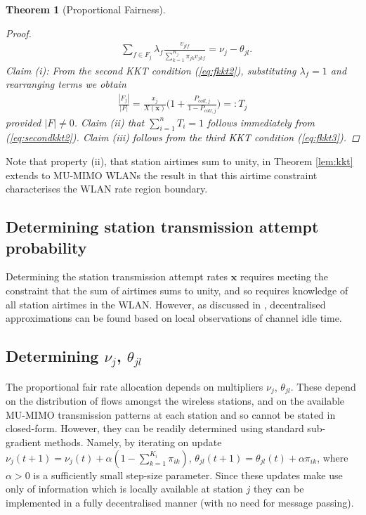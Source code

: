 \documentclass[11pt]{amsart}
\def\m#1{\mathbf{#1}}
\newtheorem{theorem}{Theorem}
\begin{document}
\begin{theorem}[Proportional Fairness]
\begin{proof}
\begin{align}
&\sum_{f \in F_j} \lambda_f \frac{v_{jlf} }{\sum_{k=1}^{K_j} {\pi_{jk}} v_{jkf} } = \nu_j  - \theta_{jl} \label{eq:fkkt3}.
\end{align}
\normalsize
Claim (i): From the second KKT condition (\ref{eq:fkkt2}), substituting $\lambda_f=1$ and rearranging terms we obtain
\begin{align}
\frac{ |F_j|  }{ {|F| }} =  \frac{x_j }{X(\m{x})} \Bigg (1+ \frac{P_{coll,j}}{1-P_{coll,j}} \Bigg ) =: T_j \label{eq:secondkkt2}
\end{align}
provided $|F|  \ne 0$.  Claim (ii) that $\sum_{i=1}^n T_i=1$ follows  immediately from (\ref{eq:secondkkt2}).   Claim (iii) follows from the third KKT condition (\ref{eq:fkkt3}).   
\end{proof}
\end{theorem}

Note that property (ii), that station airtimes sum to unity,  in Theorem \ref{lem:kkt} extends to MU-MIMO WLANs the result in \cite{DBLP:journals/corr/abs-1206-3120} that this airtime constraint characterises the WLAN rate region boundary.

\subsection{Determining station transmission attempt probability}
Determining the station transmission attempt rates $\m{x}$ requires meeting the constraint that the sum of airtimes sums to unity, and so requires knowledge of all station airtimes in the WLAN.  However, as discussed in \cite{5910091}, decentralised approximations can be found based on local observations of channel idle time.

\subsection{Determining $\nu_j$, $\theta_{jl}$}
The proportional fair rate allocation depends on multipliers $\nu_j$, $\theta_{jl}$.   These depend on the distribution of flows amongst the wireless stations, and on the available MU-MIMO transmission patterns at each station and so cannot be stated in closed-form.   However, they can be readily determined using standard sub-gradient methods.  Namely, by iterating on update $\nu_j(t+1) = \nu_j(t) + \alpha ( 1- \sum_{k=1}^{K_i} \pi_{ik} )$, $\theta_{jl}(t+1)=\theta_{jl}(t)+\alpha \pi_{ik}$, where $\alpha>0$ is a sufficiently small step-size parameter.   Since these updates make use only of information which is locally available at station $j$ they can be implemented in a fully decentralised manner (with no need for message passing).
\end{document}
